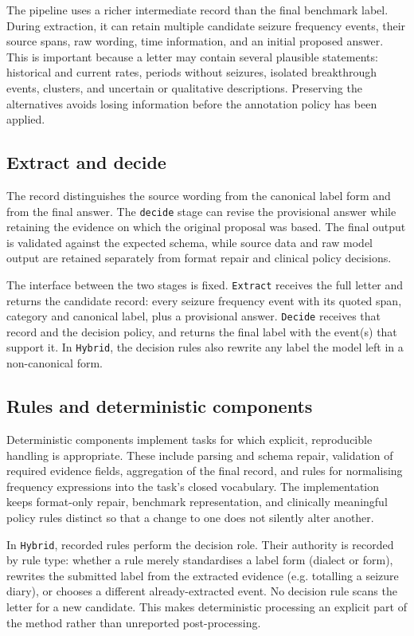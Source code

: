 \documentclass[conference]{IEEEtran}
\begin{document}
The pipeline uses a richer intermediate record than the 
final benchmark label. During extraction, it can retain 
multiple candidate seizure frequency events, their source 
spans, raw wording, time information, and an initial 
proposed answer. This is important because a letter 
may contain several plausible statements: historical 
and current rates, periods without seizures, isolated 
breakthrough events, clusters, and uncertain or 
qualitative descriptions. Preserving the alternatives avoids 
losing information before the annotation policy has been 
applied.

\subsection{Extract and decide}

The record distinguishes the source wording from the 
canonical label form and from the final answer. The 
\texttt{decide} stage can revise the provisional 
answer while retaining the evidence on which 
the original proposal was based. The final output is 
validated against the expected schema, while source 
data and raw model output are retained separately 
from format repair and clinical policy decisions.

The interface between the two stages is fixed. 
\texttt{Extract} receives the full letter and returns the 
candidate record: every seizure frequency event with its 
quoted span, category and canonical label, plus a 
provisional answer. \texttt{Decide} receives that record 
and the decision policy, and returns the 
final label with the event(s) that support it. In 
\texttt{Hybrid}, the decision rules also rewrite any 
label the model left in a non-canonical form.

\subsection{Rules and deterministic components}

Deterministic components implement tasks for which explicit, 
reproducible handling is appropriate. These include parsing 
and schema repair, validation of required evidence fields, 
aggregation of the final record, and rules for normalising 
frequency expressions into the task's closed vocabulary. The 
implementation keeps format-only repair, benchmark 
representation, and clinically meaningful policy rules distinct 
so that a change to one does not silently alter another.

In \texttt{Hybrid}, recorded rules perform the decision 
role. Their authority is recorded by rule type: whether a 
rule merely standardises a label form (dialect or 
form), rewrites the submitted label from the extracted 
evidence (e.g. totalling a seizure diary), or chooses a 
different already-extracted event. No decision 
rule scans the letter for a new candidate. This makes 
deterministic processing an explicit part of the method 
rather than unreported post-processing. 
\end{document}
